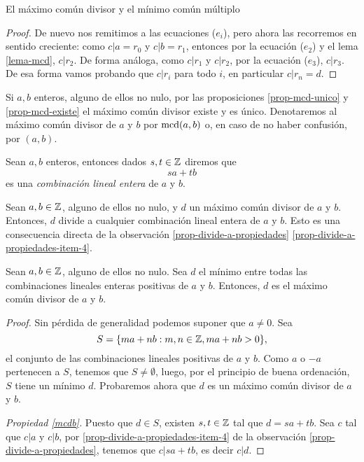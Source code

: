 \begin{section}{El máximo común divisor y el mínimo común múltiplo}
\begin{proof}
    De nuevo nos remitimos a las ecuaciones ($e_i$), pero ahora las recorremos en sentido creciente: como $c |a=r_0$ y $c| b= r_1$,  entonces por la ecuación ($e_{2}$) y el lema \ref{lema-mcd}, $c | r_2$. De forma análoga, como $c|r_1$ y $c|r_2$, por la ecuación ($e_{3}$), $c | r_3$. De esa forma vamos probando que $c|r_i$ para todo $i$,  en particular $c|r_n = d$.
\end{proof}

Si $a,b$ enteros,  alguno de ellos  no nulo,  por las proposiciones \ref{prop-mcd-unico} y \ref{prop-mcd-existe} el máximo común divisor existe y es único. Denotaremos al máximo común divisor  de $a$ y $b$ por $\operatorname{mcd}(a,b)$ o, en caso de no haber confusión, por $(a,b)$.


\begin{definicion} Sean $a,b$ enteros, entonces dados $s,t \in \mathbb Z$ diremos que
    $$
    sa+tb
    $$ 
    es una  \textit{combinación lineal entera} de $a$ y $b$. 
\end{definicion}

\begin{observacion*} Sean $a,b \in \mathbb Z$, alguno de ellos no nulo, y $d$ un máximo común divisor de $a$ y $b$. Entonces, $d$ divide a cualquier combinación lineal entera de $a$ y $b$. Esto es una consecuencia directa de la observación \ref{prop-divide-a-propiedades} \ref{prop-divide-a-propiedades-item-4}.
\end{observacion*}

\begin{teorema}\label{th-existencia-mcd}
    Sean $a,b \in \mathbb Z$, alguno de ellos no nulo. Sea $d$ el mínimo entre todas las combinaciones lineales enteras positivas de $a$ y $b$.  Entonces,  $d$ es el máximo común divisor de $a$ y $b$. 
\end{teorema}
\begin{proof}
    Sin pérdida de generalidad podemos suponer que  $a \ne 0$. Sea 
    \begin{equation*}
    S = \{m a+n b : m,n\in \mathbb Z, m a+n b>0\},
    \end{equation*}
    el conjunto de las combinaciones lineales positivas de $a$ y $b$. Como  $a$ o $-a$ pertenecen a $S$, tenemos que  $S \not= \emptyset$, luego, por el principio de buena ordenación, $S$ tiene un  mínimo $d$. Probaremos ahora que  $d$  es un  máximo común divisor de $a$ y $b$. 
    
    \textit{Propiedad {\ref{mcdb}}.} Puesto  que $d \in S$,  existen $s, t \in \mathbb Z$ tal que $d = sa+tb$. Sea $c$ tal que $c|a$ y $c|b$, por \ref{prop-divide-a-propiedades-item-4} de la observación \ref{prop-divide-a-propiedades},  tenemos que $c|sa+tb$,  es decir $c|d$. 
    

\end{proof}
\end{section}
